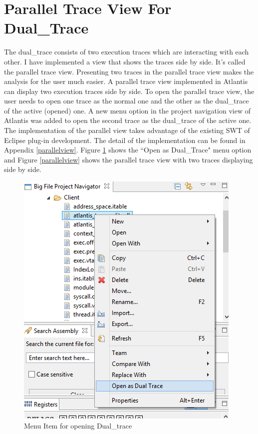 \section{Parallel Trace View For Dual\_Trace}
The dual\_trace consists of two execution traces which are interacting with each other. I have implemented a view that shows the traces side by side. It's called the parallel trace view. Presenting two traces in the parallel trace view makes the analysis for the user much easier. A parallel trace view implemented in Atlantis can display two execution traces side by side. To open the parallel trace view, the user needs to open one trace as the normal one and the other as the dual\_trace of the active (opened) one. A new menu option in the project navigation view of Atlantis was added to open the second trace as the dual\_trace of the active one. The implementation of the parallel view takes advantage of the existing SWT of Eclipse plug-in development. The detail of the implementation can be found in Appendix \ref{parallelview}. Figure \ref{opendualtracemenu} shows the ``Open as Dual\_Trace" menu option and Figure \ref{parallelview} shows the parallel trace view with two traces displaying side by side.

\begin{figure}[H]
\centerline{\includegraphics[scale=0.4]{Figures/opendualtracemenu}}
 \caption{Menu Item for opening Dual\_trace}
\label{opendualtracemenu}
\end{figure}

